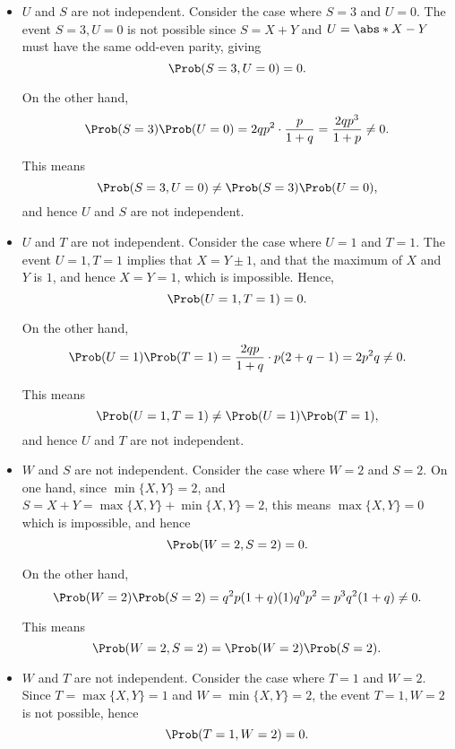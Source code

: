 \begin{enumerate}
\begin{itemize}
              \item \(U\) and \(S\) are not independent. Consider the case where \(S = 3\) and \(U = 0\). The event \(S = 3, U = 0\) is not possible since \(S = X + Y\) and \(U = \abs*{X - Y}\) must have the same odd-even parity, giving
                    \[
                        \Prob(S = 3, U = 0) = 0.
                    \]

                    On the other hand,
                    \[
                        \Prob(S = 3) \Prob(U = 0) = 2 q p^2 \cdot \frac{p}{1 + q} = \frac{2qp^3}{1 + p} \neq 0.
                    \]

                    This means
                    \[
                        \Prob(S = 3, U = 0) \neq \Prob(S = 3) \Prob(U = 0),
                    \]
                    and hence \(U\) and \(S\) are not independent.
              \item \(U\) and \(T\) are not independent. Consider the case where \(U = 1\) and \(T = 1\).  The event \(U = 1, T = 1\) implies that \(X = Y \pm 1\), and that the maximum of \(X\) and \(Y\) is \(1\), and hence \(X = Y = 1\), which is impossible. Hence,
                    \[
                        \Prob(U = 1, T = 1) = 0.
                    \]

                    On the other hand,
                    \[
                        \Prob(U = 1) \Prob(T = 1) = \frac{2qp}{1 + q} \cdot p(2 + q - 1) = 2p^2 q \neq 0.
                    \]

                    This means
                    \[
                        \Prob(U = 1, T = 1) \neq \Prob(U = 1) \Prob(T = 1),
                    \]
                    and hence \(U\) and \(T\) are not independent.
              \item \(W\) and \(S\) are not independent. Consider the case where \(W = 2\) and \(S = 2\). On one hand, since \(\min\{X, Y\} = 2\), and \(S = X + Y = \max\{X, Y\} + \min\{X, Y\} = 2\), this means \(\max\{X, Y\} = 0\) which is impossible, and hence
                    \[
                        \Prob(W = 2, S = 2) = 0.
                    \]

                    On the other hand,
                    \[
                        \Prob(W = 2) \Prob(S = 2) = q^2 p (1 + q) (1) q^{0} p^2 = p^3 q^2 (1 + q) \neq 0.
                    \]

                    This means
                    \[
                        \Prob(W = 2, S = 2) = \Prob(W = 2) \Prob(S = 2).
                    \]
              \item \(W\) and \(T\) are not independent. Consider the case where \(T = 1\) and \(W = 2\). Since \(T = \max\{X, Y\} = 1\) and \(W = \min\{X, Y\} = 2\), the event \(T = 1, W = 2\) is not possible, hence
                    \[
                        \Prob(T = 1, W = 2) = 0.
                    \]


\end{itemize}
\end{enumerate}
